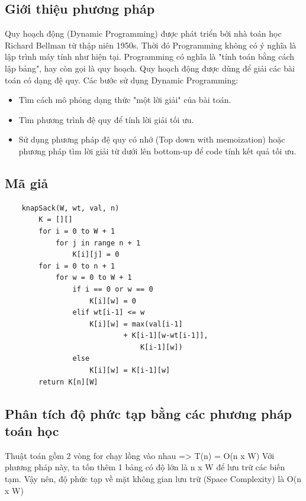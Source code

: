 \documentclass[12pt,a4paper]{report}
\begin{document}
    \subsection{Giới thiệu phương pháp}
    Quy hoạch động (Dynamic Programming) được phát triển bởi nhà toán học Richard Bellman từ thập niên 
    1950s. Thời đó Programming không có ý nghĩa là lập trình máy tính như hiện tại.
    Programming có nghĩa là "tính toán bằng cách lập bảng", hay còn gọi là quy hoạch.
    Quy hoạch động được dùng để giải các bài toán có dạng đệ quy.
    Các bước sử dụng Dynamic Programming:
    \begin{itemize}
        \item Tìm cách mô phỏng dạng thức "một lời giải" của bài toán.
        \item Tìm phương trình đệ quy để tính lời giải tối ưu.
        \item Sử dụng phương pháp đệ quy có nhớ (Top down with memoization) hoặc
    phương pháp tìm lời giải từ dưới lên bottom-up để code tính kết quả tối ưu.
    \end{itemize}
    \subsection{Mã giả}
    \begin{lstlisting}
    knapSack(W, wt, val, n)
        K = [][]
        for i = 0 to W + 1
            for j in range n + 1
                K[i][j] = 0
        for i = 0 to n + 1 
            for w = 0 to W + 1 
                if i == 0 or w == 0 
                    K[i][w] = 0
                elif wt[i-1] <= w
                    K[i][w] = max(val[i-1] 
                            + K[i-1][w-wt[i-1]],   
                                K[i-1][w]) 
                else
                    K[i][w] = K[i-1][w] 
        return K[n][W] 
    \end{lstlisting}
    \subsection{Phân tích độ phức tạp bằng các phương pháp toán học}
    Thuật toán gồm 2 vòng for chạy lồng vào nhau => 
    T(n) = O(n x W)
    Với phương pháp này, ta tốn thêm 1 bảng có độ lớn là n x W để lưu trữ các 
    biến tạm. Vậy nên, độ phức tạp về mặt không gian lưu trữ (Space Complexity) là
    O(n x W)
\end{document}
